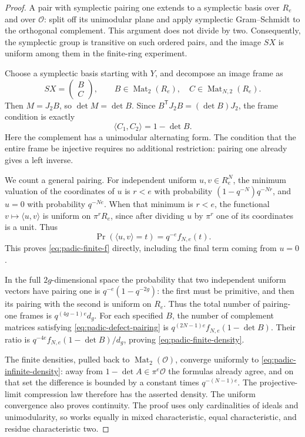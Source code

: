 \begin{proof}
A pair with symplectic pairing one extends to a symplectic basis over
$R_e$ and over $\mathcal O$: split off its unimodular plane and apply
symplectic Gram--Schmidt to the orthogonal complement. This argument
does not divide by two. Consequently, the symplectic group is
transitive on such ordered pairs, and the image $SX$ is uniform among
them in the finite-ring experiment.

Choose a symplectic basis starting with $Y$, and decompose an image
frame as
\[
 SX=\begin{pmatrix} B\\ C\end{pmatrix},\qquad
 B\in\operatorname{Mat}_2(R_e),\quad
 C\in\operatorname{Mat}_{N,2}(R_e).
\]
Then $M=J_2B$, so $\det M=\det B$. Since
$B^{\mathsf T}J_2B=(\det B)J_2$, the frame condition is exactly
\begin{equation}\label{eq:padic-defect-pairing}
 \langle C_1,C_2\rangle=1-\det B.
\end{equation}
Here the complement has a unimodular alternating form. The condition
that the entire frame be injective requires no additional restriction:
pairing one already gives a left inverse.

We count a general pairing. For independent uniform $u,v\in R_e^N$,
the minimum valuation of the coordinates of $u$ is $r<e$ with
probability $(1-q^{-N})q^{-Nr}$, and $u=0$ with probability $q^{-Ne}$.
When that minimum is $r<e$, the functional
$v\mapsto\langle u,v\rangle$ is uniform on $\pi^rR_e$, since after
dividing $u$ by $\pi^r$ one of its coordinates is a unit. Thus
\[
 \Pr(\langle u,v\rangle=t)=q^{-e}f_{N,e}(t).
\]
This proves \eqref{eq:padic-finite-f} directly, including the final term
coming from $u=0$.

In the full $2g$-dimensional space the probability that two independent
uniform vectors have pairing one is $q^{-e}(1-q^{-2g})$: the first
must be primitive, and then its pairing with the second is uniform
on $R_e$. Thus the total number of pairing-one frames is
$q^{(4g-1)e}d_g$. For each specified $B$, the number of complement
matrices satisfying \eqref{eq:padic-defect-pairing} is
$q^{(2N-1)e}f_{N,e}(1-\det B)$. Their ratio is
$q^{-4e}f_{N,e}(1-\det B)/d_g$, proving
\eqref{eq:padic-finite-density}.

The finite densities, pulled back to $\operatorname{Mat}_2(\mathcal O)$,
converge uniformly to \eqref{eq:padic-infinite-density}: away from
$1-\det A\in\pi^e\mathcal O$ the formulas already agree, and on that
set the difference is bounded by a constant times $q^{-(N-1)e}$.
The projective-limit compression law therefore has the asserted
density. The uniform convergence also proves continuity. The proof
uses only cardinalities of ideals and unimodularity, so works equally
in mixed characteristic, equal characteristic, and residue
characteristic two.
\end{proof}

